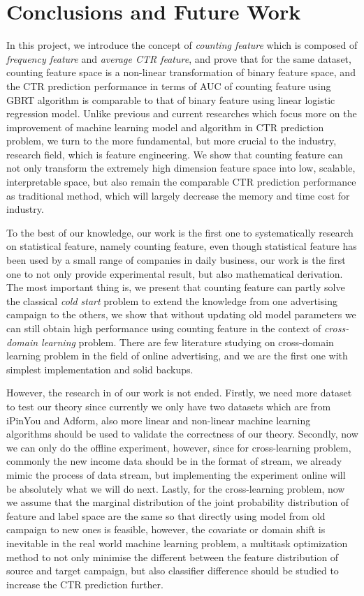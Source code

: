 \chapter{Conclusions and Future Work}
\label{conclusion}
In this project, we introduce the concept of \textit{counting feature} which is composed of \textit{frequency feature} and \textit{average CTR feature}, and prove that for the same dataset, counting feature space is a non-linear transformation of binary feature space, and the CTR prediction performance in terms of AUC of counting feature using GBRT algorithm is comparable to that of binary feature using linear logistic regression model. Unlike previous and current researches which focus more on the improvement of machine learning model and algorithm in CTR prediction problem, we turn to the more fundamental, but more crucial to the industry, research field, which is feature engineering. We show that counting feature can not only transform the extremely high dimension feature space into low, scalable, interpretable space, but also remain the comparable CTR prediction performance as traditional method, which will largely decrease the memory and time cost for industry. 

To the best of our knowledge, our work is the first one to systematically research on statistical feature, namely counting feature, even though statistical feature has been used by a small range of companies in daily business, our work is the first one to not only provide experimental result, but also mathematical derivation. The most important thing is, we present that counting feature can partly solve the classical \textit{cold start} problem to extend the knowledge from one advertising campaign to the others, we show that without updating old model parameters we can still obtain high performance using counting feature in the context of \textit{cross-domain learning} problem. There are few literature studying on cross-domain learning problem in the field of online advertising, and we are the first one with simplest implementation and solid backups.

However, the research in of our work is not ended. Firstly, we need more dataset to test our theory since currently we only have two datasets which are from iPinYou and Adform, also more linear and non-linear machine learning algorithms should be used to validate the correctness of our theory. Secondly, now we can only do the offline experiment, however, since for cross-learning problem, commonly the new income data should be in the format of stream, we already mimic the process of data stream, but implementing the experiment online will be absolutely what we will do next. Lastly, for the cross-learning problem, now we assume that the marginal distribution of the joint probability distribution of feature and label space are the same so that directly using model from old campaign to new ones is feasible, however, the covariate or domain shift is inevitable in the real world machine learning problem, a multitask optimization method to not only minimise the different between the feature distribution of source and target campaign, but also classifier difference should be studied to increase the CTR prediction further.
